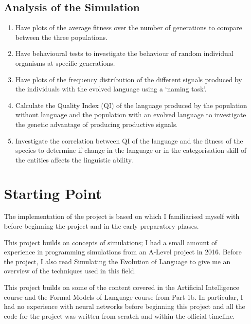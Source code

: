 \documentclass[12pt,a4paper,twoside,openright]{report}
\begin{document}
\subsection*{Analysis of the Simulation}

\begin{enumerate}

\item Have plots of the average fitness over the number of generations to compare between the three populations.

\item Have behavioural tests to investigate the behaviour of random individual organisms at specific generations.

\item Have plots of the frequency distribution of the different signals produced by the individuals with the evolved language using a `naming task'.

\item Calculate the Quality Index (QI) of the language produced by the population without language and the population with an evolved language to investigate the genetic advantage of producing productive signals. 

\item Investigate the correlation between QI of the language and the fitness of the species to determine if change in the language or in the categorisation skill of the entities affects the linguistic ability.

\end{enumerate}

\section{Starting Point}\label{section:starting}

The implementation of the project is based on \citet{Cangelosi1998} which I familiarised myself with before beginning the project and in the early preparatory phases.

This project builds on concepts of simulations; I had a small amount of experience in programming simulations from an A-Level project in 2016. Before the project, I also read Simulating the Evolution of Language \citep{Cangelosi2002} to give me an overview of the techniques used in this field. 

This project builds on some of the content covered in the Artificial Intelligence course and the Formal Models of Language course from Part 1b. In particular, I had no experience with neural networks before beginning this project and all the code for the project was written from scratch and within the official timeline.
\end{document}
